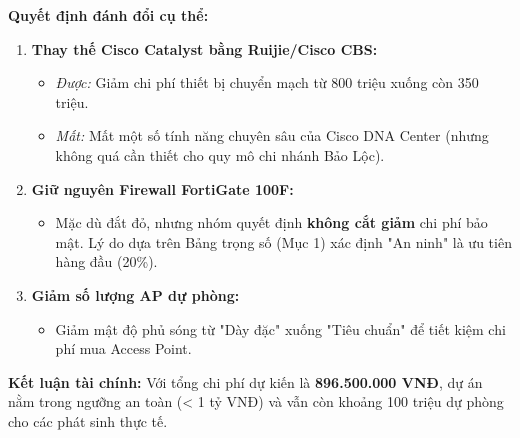 \textbf{Quyết định đánh đổi cụ thể:}
\begin{enumerate}
    \item \textbf{Thay thế Cisco Catalyst bằng Ruijie/Cisco CBS:}
    \begin{itemize}
        \item \textit{Được:} Giảm chi phí thiết bị chuyển mạch từ 800 triệu xuống còn 350 triệu.
        \item \textit{Mất:} Mất một số tính năng chuyên sâu của Cisco DNA Center (nhưng không quá cần thiết cho quy mô chi nhánh Bảo Lộc).
    \end{itemize}
    
    \item \textbf{Giữ nguyên Firewall FortiGate 100F:}
    \begin{itemize}
        \item Mặc dù đắt đỏ, nhưng nhóm quyết định \textbf{không cắt giảm} chi phí bảo mật. Lý do dựa trên Bảng trọng số (Mục 1) xác định "An ninh" là ưu tiên hàng đầu (20\%).
    \end{itemize}
    
    \item \textbf{Giảm số lượng AP dự phòng:}
    \begin{itemize}
        \item Giảm mật độ phủ sóng từ "Dày đặc" xuống "Tiêu chuẩn" để tiết kiệm chi phí mua Access Point.
    \end{itemize}
\end{enumerate}

\textbf{Kết luận tài chính:} Với tổng chi phí dự kiến là \textbf{896.500.000 VNĐ}, dự án nằm trong ngưỡng an toàn (< 1 tỷ VNĐ) và vẫn còn khoảng 100 triệu dự phòng cho các phát sinh thực tế.